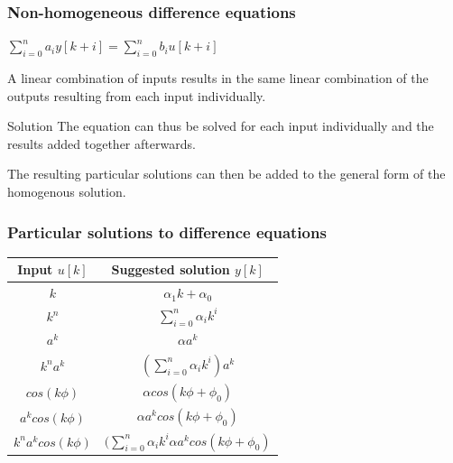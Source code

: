 \begin{frame}
	\frametitle{Non-homogeneous difference equations}
	\begin{definition}
		\begin{center}
			$\sum\limits_{i=0}^n a_iy[k+i] = \sum\limits_{i=0}^n b_iu[k+i]$\\
		\end{center}
	 	A linear combination of inputs results in the same linear combination of the outputs resulting from each input individually.
	\end{definition}
	\begin{block}{Solution}
		The equation can thus be solved for each input individually and the results added together afterwards.
			
		The resulting particular solutions can then be added to the general form of the homogenous solution.
	\end{block}
\end{frame}
\begin{frame}
	\frametitle{Particular solutions to difference equations}
	\begin{tabular}{|c|c|}
		\hline Input $u[k]$ & Suggested solution $y[k]$  \\ 
		\hline $k$ & $\alpha_1k+\alpha_0 $\\ 
		\hline $k^{n}$ & $\sum\limits_{i=0}^{n}\alpha_{i}k^{i}$ \\ 
		\hline $a^{k}$&  $\alpha a^{k}$\\ 
		\hline $k^{n}a^{k}$ & $(\sum\limits_{i=0}^{n}\alpha_{i}k^{i})a^{k}$  \\ 
		\hline $cos(k\phi)$ & $\alpha cos(k\phi + \phi_0)$\\ 
		\hline $a^{k}cos(k\phi)$ & $\alpha a^{k} cos(k\phi + \phi_0)$  \\ 
		\hline  $k^{n}a^{k}cos(k\phi)$&  $(\sum\limits_{i=0}^{n}\alpha_{i}k^{i}\alpha a^{k} cos(k\phi + \phi_0)$ \\ 
		\hline 
	\end{tabular} 
\end{frame}
